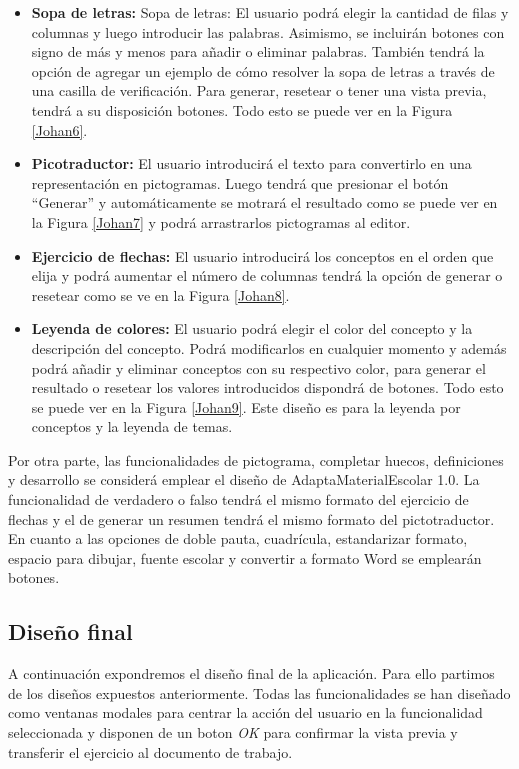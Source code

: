 \begin{itemize}
  \item \textbf{Sopa de letras:} Sopa de letras: El usuario podrá elegir la cantidad de filas y columnas y luego introducir las palabras. Asimismo, se incluirán botones con signo de más y menos para añadir o eliminar palabras. También tendrá la opción de agregar un ejemplo de cómo resolver la sopa de letras a través de una casilla de verificación. Para generar, resetear o tener una vista previa, tendrá a su disposición botones. Todo esto se puede ver en la Figura \ref{Johan6}.
  \item \textbf{Picotraductor:} El usuario introducirá el texto para convertirlo en una representación en pictogramas. Luego tendrá que presionar el botón ``Generar'' y automáticamente se motrará el resultado como se puede ver en la Figura \ref{Johan7} y podrá arrastrarlos pictogramas al editor.
  \item \textbf{Ejercicio de flechas:} El usuario introducirá los conceptos en el orden que elija y podrá aumentar el número de columnas tendrá la opción de generar o resetear como se ve en la Figura \ref{Johan8}.
  \item  \textbf{Leyenda de colores:} El usuario podrá elegir el color del concepto y la descripción del concepto. Podrá modificarlos en cualquier momento y además podrá añadir y eliminar conceptos con su respectivo color, para generar el resultado o resetear los valores introducidos dispondrá de botones. Todo esto se puede ver en la Figura \ref{Johan9}. Este diseño es para la leyenda por conceptos y la leyenda de temas.
\end{itemize}
Por otra parte, las funcionalidades de pictograma, completar huecos, definiciones y desarrollo se considerá emplear el diseño de AdaptaMaterialEscolar 1.0. La funcionalidad de verdadero o falso tendrá el mismo formato del ejercicio de flechas y el de generar un resumen tendrá el mismo formato del pictotraductor. En cuanto a las opciones de doble pauta, cuadrícula, estandarizar formato, espacio para dibujar, fuente escolar y convertir a formato Word se emplearán botones.

\subsection{Diseño final}\label{subsec:DisenyoFinal}
A continuación expondremos el diseño final de la aplicación. Para ello partimos de los diseños expuestos anteriormente. Todas las funcionalidades se han diseñado como ventanas modales para centrar la acción del usuario en la funcionalidad seleccionada y disponen de un boton \textit{OK} para confirmar la vista previa y transferir el ejercicio al documento de trabajo.

